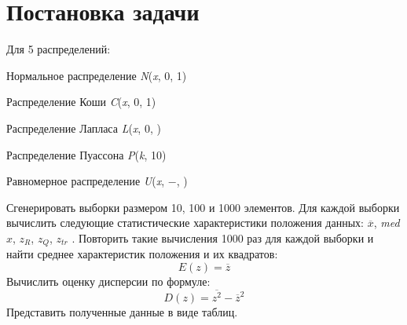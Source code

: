 \documentclass[a4paper]{article}
\begin{document}
\begin{center}
    \tableofcontents
\end{center}
\setcounter{page}{2}
\newpage

\begin{center}
    \listoftables
\end{center}
\newpage

\section{Постановка задачи}
 Для 5 распределений:
 \begin{enumerate}
    \begin{item}
            Нормальное распределение \textit{N}(\normalsize{\textit{x}}, \normalsize{0}, \normalsize{1})
        \end{item}
        \begin{item}
            Распределение Коши \textit{C}(\normalsize{\textit{x}}, \normalsize{0}, \normalsize{1})
        \end{item}
        \begin{item}
            Распределение Лапласа \textit{L}(\normalsize{\textit{x}}, \normalsize{0}, \scriptsize{})
        \end{item} 
        \begin{item} 
            Распределение Пуассона \textit{P}(\normalsize{\textit{k}}, \normalsize{10})
        \end{item}
        \begin{item}
            Равномерное распределение \textit{U}(\normalsize{\textit{x}}, \normalsize{$-$}, \normalsize{})
        \end{item}
 \end{enumerate}
 Сгенерировать выборки размером 10, 100 и 1000 элементов.
Для каждой выборки вычислить следующие статистические характеристики положения данных: $\overline{x}$, \textit{med} $x$, $z_R$, $z_Q$, $z_{tr}$ . Повторить такие
вычисления 1000 раз для каждой выборки и найти среднее характеристик положения и их квадратов:
\begin{equation} \label{E}
    E(z) = \overline{z}
\end{equation}
Вычислить оценку дисперсии по формуле:
    \begin{equation}\label{D}
        D(z) = \overline{z^2} - {\overline{z}}^2
    \end{equation}
Представить полученные данные в виде таблиц.
\end{document}
